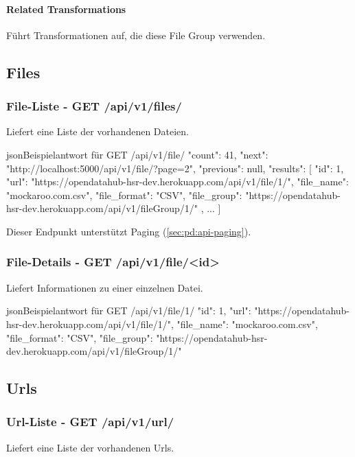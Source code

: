 \paragraph{Related Transformations} Führt Transformationen auf, die diese File Group verwenden.

\subsection{Files} \label{sec:pd:api-files}
\subsubsection{File-Liste - GET /api/v1/files/}
Liefert eine Liste der vorhandenen Dateien.

\begin{srclst}{json}{Beispielantwort für GET /api/v1/file/}
{
    "count": 41, 
    "next": "http://localhost:5000/api/v1/file/?page=2", 
    "previous": null, 
    "results": [
        {
          "id": 1, 
          "url": "https://opendatahub-hsr-dev.herokuapp.com/api/v1/file/1/", 
          "file_name": "mockaroo.com.csv", 
          "file_format": "CSV", 
          "file_group": "https://opendatahub-hsr-dev.herokuapp.com/api/v1/fileGroup/1/"
        }, 
        ...
    ]
}
\end{srclst}

Dieser Endpunkt unterstützt Paging (\cref{sec:pd:api-paging}).

\subsubsection{File-Details - GET /api/v1/file/<id>}
Liefert Informationen zu einer einzelnen Datei.

\begin{srclst}{json}{Beispielantwort für GET /api/v1/file/1/}
{
    "id": 1, 
    "url": "https://opendatahub-hsr-dev.herokuapp.com/api/v1/file/1/", 
    "file_name": "mockaroo.com.csv", 
    "file_format": "CSV", 
    "file_group": "https://opendatahub-hsr-dev.herokuapp.com/api/v1/fileGroup/1/"
}
\end{srclst}

\subsection{Urls} \label{sec:pd:api-urls}
\subsubsection{Url-Liste - GET /api/v1/url/}
Liefert eine Liste der vorhandenen Urls.

